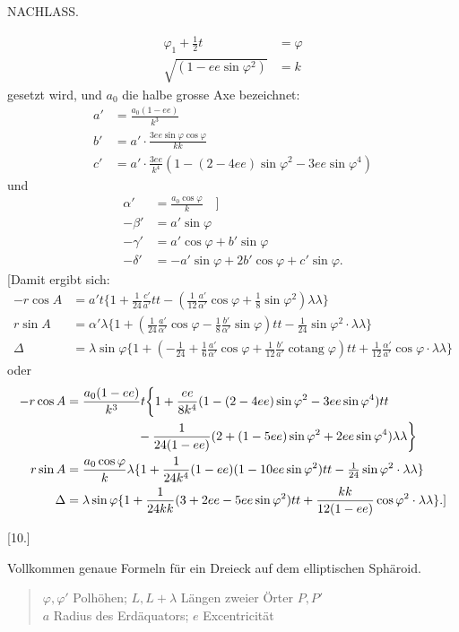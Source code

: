 \clearpage
{}\hfill NACHLASS.\hfill\mbox{}\par
\[
\begin{aligned}
\varphi_1+\tfrac12t&=\varphi\\
\sqrt{(1-ee\sin\varphi^2)}&=k
\end{aligned}
\]
gesetzt wird, und $a_0$ die halbe grosse Axe bezeichnet:
\[
\begin{aligned}
a'&=\frac{a_0(1-ee)}{k^3}\\
b'&=a'\cdot\frac{3ee\sin\varphi\cos\varphi}{kk}\\
c'&=a'\cdot\frac{3ee}{k^4}(1-(2-4ee)\sin\varphi^2-3ee\sin\varphi^4)
\end{aligned}
\]
und
\[
\begin{aligned}
\alpha'&=\frac{a_0\cos\varphi}{k}\quad\bigg]\\
-\beta'&=a'\sin\varphi\\
-\gamma'&=a'\cos\varphi+b'\sin\varphi\\
-\delta'&=-a'\sin\varphi+2b'\cos\varphi+c'\sin\varphi.
\end{aligned}
\]
[Damit ergibt sich:
\[
\begin{aligned}
-r\cos A&=a't\{1+\tfrac1{24}\tfrac{c'}{a'}tt-(\tfrac1{12}\tfrac{a'}{\alpha'}\cos\varphi+\tfrac18\sin\varphi^2)\lambda\lambda\}\\
r\sin A&=\alpha'\lambda\{1+(\tfrac1{24}\tfrac{a'}{\alpha'}\cos\varphi-\tfrac18\tfrac{b'}{\alpha'}\sin\varphi)tt-\tfrac1{24}\sin\varphi^2\cdot\lambda\lambda\}\\
\Delta&=\lambda\sin\varphi\{1+(-\tfrac1{24}+\tfrac16\tfrac{a'}{\alpha'}\cos\varphi+\tfrac1{12}\tfrac{b'}{a'}\operatorname{cotang}\varphi)tt+\tfrac1{12}\tfrac{\alpha'}{a'}\cos\varphi\cdot\lambda\lambda\}
\end{aligned}
\]
oder
\[
\begin{aligned}
-r\cos A&=\frac{a_0(1-ee)}{k^3}t\bigg\{1+\frac{ee}{8k^4}(1-(2-4ee)\sin\varphi^2-3ee\sin\varphi^4)tt\\
&\hspace{20mm}-\frac{1}{24(1-ee)}(2+(1-5ee)\sin\varphi^2+2ee\sin\varphi^4)\lambda\lambda\bigg\}\\
r\sin A&=\frac{a_0\cos\varphi}{k}\lambda\{1+\frac{1}{24k^4}(1-ee)(1-10ee\sin\varphi^2)tt-\tfrac1{24}\sin\varphi^2\cdot\lambda\lambda\}\\
\Delta&=\lambda\sin\varphi\{1+\frac{1}{24kk}(3+2ee-5ee\sin\varphi^2)tt+\frac{kk}{12(1-ee)}\cos\varphi^2\cdot\lambda\lambda\}.]
\end{aligned}
\]
\begin{center}[10.]\end{center}
Vollkommen genaue Formeln für ein Dreieck auf dem elliptischen Sphäroid.
\begin{quote}
$\varphi,\varphi'$ Polhöhen; $L,L+\lambda$ Längen zweier Örter $P,P'$\\
$a$ Radius des Erdäquators; $e$ Excentricität
\end{quote}

